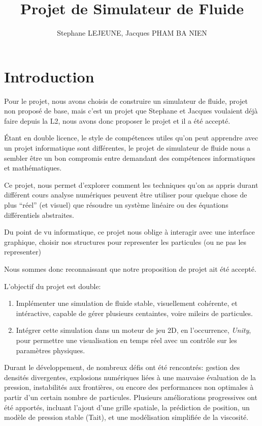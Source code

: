 \documentclass{article}
\author{Stephane LEJEUNE, Jacques PHAM BA NIEN} %
\title{Projet de Simulateur de Fluide}
\begin{document}
\maketitle
\newpage
\tableofcontents
\newpage

\section{Introduction}

Pour le projet, nous avons choisis de construire un simulateur de fluide, projet non proposé de base, mais c'est un projet que Stephane et Jacques voulaient déjà faire depuis la L2, nous avons donc proposer le projet et il a été accepté.

Étant en double licence, le style de compétences utiles qu'on peut apprendre avec un projet informatique sont différentes, le projet de simulateur de fluide nous a sembler être un bon compromis entre demandant des compétences informatiques et mathématiques. 

Ce projet, nous permet d'explorer comment les techniques qu'on as appris durant différent cours analyse numériques peuvent être utiliser pour quelque chose de plus ``réel'' (et visuel) que résoudre un système linéaire ou des équations différentiels abstraites.

Du point de vu informatique, ce projet nous oblige à interagir avec une interface graphique, choisir nos structures pour representer les particules (ou ne pas les representer)

Nous sommes donc reconnaissant que notre proposition de projet ait été accepté.

L'objectif du projet est double:
\begin{enumerate}
    \item Implémenter une simulation de fluide stable, visuellement cohérente, et intéractive, capable de gérer plusieurs centaintes, voire mileirs de particules.
    \item Intégrer cette simulation dans un moteur de jeu 2D, en l'occurrence, {\emph {Unity}}, pour permettre une visualisation en temps réel avec un contrôle sur les paramètres physiques.
\end{enumerate}

Durant le développement, de nombreux défis ont été rencontrés: gestion des densités divergentes, explosions numériques liées à une mauvaise évaluation de la pression, instabilités aux frontières, ou encore des performances non optimales à partir d'un certain nombre de particules. Plusieurs améliorations progressives ont été apportés, incluant l'ajout d'une grille spatiale, la prédiction de position, un modèle de pression stable (Tait), et une modélisation simplifiée de la viscosité.
\end{document}
